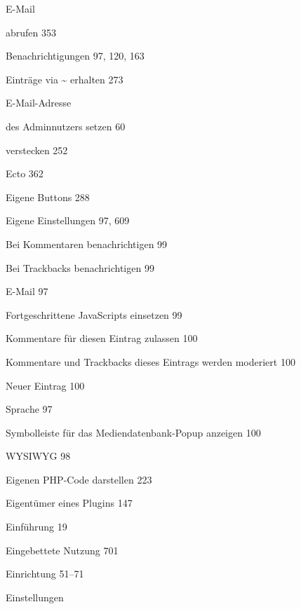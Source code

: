 \documentclass{book}
\renewcommand\subitem{\par}
\begin{document}
\begin{multicols}{2}
\begin{osp-index}
  \item E-Mail
    \subitem abrufen\hspace{1mm} 353
    \subitem Benachrichtigungen\hspace{1mm} 97, 120, 163
    \subitem Eintr\"age via \textasciitilde{} erhalten\hspace{1mm} 273
  \item E-Mail-Adresse
    \subitem des Adminnutzers setzen\hspace{1mm} 60
    \subitem verstecken\hspace{1mm} 252
  \item Ecto\hspace{1mm} 362
  \item Eigene Buttons\hspace{1mm} 288
  \item Eigene Einstellungen\hspace{1mm} 97, 609
    \subitem Bei Kommentaren benachrichtigen\hspace{1mm} 99
    \subitem Bei Trackbacks benachrichtigen\hspace{1mm} 99
    \subitem E-Mail\hspace{1mm} 97
    \subitem Fortgeschrittene JavaScripts einsetzen\hspace{1mm} 99
    \subitem Kommentare f\"ur diesen Eintrag zulassen\hspace{1mm} 100
    \subitem Kommentare und Trackbacks dieses Eintrags werden moderiert\hspace{1mm} 
		100
    \subitem Neuer Eintrag\hspace{1mm} 100
    \subitem Sprache\hspace{1mm} 97
    \subitem Symbolleiste f\"ur das Mediendatenbank-Popup anzeigen\hspace{1mm} 
		100
    \subitem WYSIWYG\hspace{1mm} 98
  \item Eigenen PHP-Code darstellen\hspace{1mm} 223
  \item Eigent\"umer eines Plugins\hspace{1mm} 147
  \item Einf\"uhrung\hspace{1mm} 19
  \item Eingebettete Nutzung\hspace{1mm} 701
  \item Einrichtung\hspace{1mm} 51--71
  \item Einstellungen

\end{osp-index}
\end{multicols}
\end{document}
